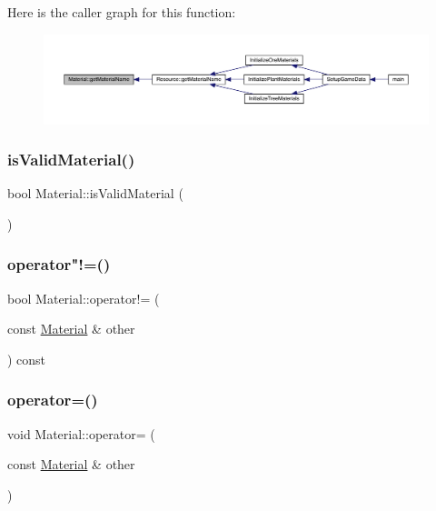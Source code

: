 Here is the caller graph for this function\+:
\nopagebreak
\begin{figure}[H]
\begin{center}
\leavevmode
\includegraphics[width=350pt]{dc/dee/class_material_a6259941981c91ac2f0c0baa0dd53c160_icgraph}
\end{center}
\end{figure}
\mbox{\label{class_material_a5701802cfadd1ded2f934f15b3f018c9}} 
\subsubsection{\texorpdfstring{is\+Valid\+Material()}{isValidMaterial()}}
{\footnotesize\ttfamily bool Material\+::is\+Valid\+Material (\begin{DoxyParamCaption}{ }\end{DoxyParamCaption})}

\mbox{\label{class_material_a16d6175216c74057b2eab09ccaa7986c}} 
\subsubsection{\texorpdfstring{operator"!=()}{operator!=()}}
{\footnotesize\ttfamily bool Material\+::operator!= (\begin{DoxyParamCaption}\item[{const \mbox{\hyperlink{class_material}{Material}} \&}]{other }\end{DoxyParamCaption}) const}

\mbox{\label{class_material_a0c841562a07082c43d64f7fa9477eb44}} 
\subsubsection{\texorpdfstring{operator=()}{operator=()}}
{\footnotesize\ttfamily void Material\+::operator= (\begin{DoxyParamCaption}\item[{const \mbox{\hyperlink{class_material}{Material}} \&}]{other }\end{DoxyParamCaption})}

